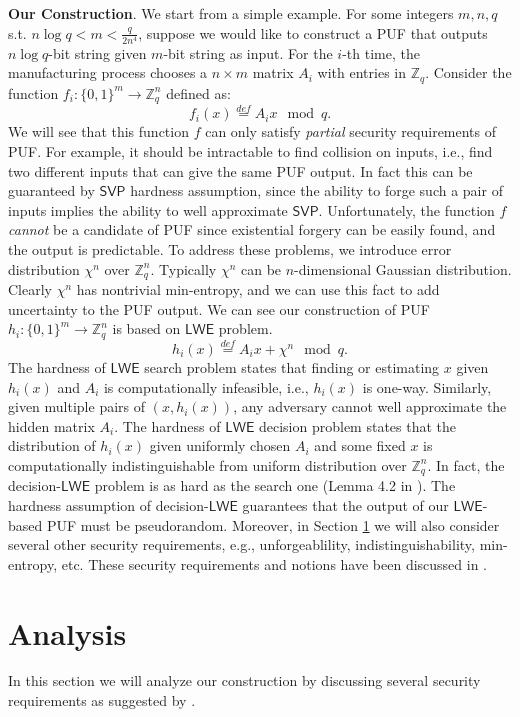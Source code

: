 \documentclass[12pt]{article}
\newcommand{\eqdef}{\stackrel{def}{=}}
\newcommand{\Z}{\mathbb{Z}}
\newcommand{\bits}{\{0,1\}}
\newcommand{\SVP}{\mathsf{SVP}}
\newcommand{\LWE}{\mathsf{LWE}}
\theoremstyle{definition}
\begin{document}
{\bf Our Construction}. We start from a simple example. For some integers $m, n, q$ s.t. $n\log q < m < \frac{q}{2n^4}$, suppose we would like to construct a PUF that outputs $n \log q$-bit string given $m$-bit string as input. For the $i$-th time, the manufacturing process chooses a $n\times m$ matrix $A_i$ with entries in $\Z_q$. Consider the function $f_i : \bits^m \to \Z_q^n$ defined as:
$$f_i(x) \eqdef A_ix \mod q.$$
We will see that this function $f$ can only satisfy \emph{partial} security requirements of PUF. For example, it should be intractable to find collision on inputs, i.e., find two different inputs that can give the same PUF output. In fact this can be guaranteed by $\SVP$ hardness assumption, since the ability to forge such a pair of inputs implies the ability to well approximate $\SVP$. Unfortunately, the function $f$ \emph{cannot} be a candidate of PUF since existential forgery can be easily found, and the output is predictable. To address these problems, we introduce error distribution $\chi^n$ over $\Z_q^n$. Typically $\chi^n$ can be $n$-dimensional Gaussian distribution. Clearly $\chi^n$ has nontrivial min-entropy, and we can use this fact to add uncertainty to the PUF output. We can see our construction of PUF $h_i : \bits^m \to \Z_q^n$ is based on $\LWE$ problem.
$$h_i(x) \eqdef A_ix + \chi^n \mod q.$$
The hardness of $\LWE$ search problem states that finding or estimating $x$ given $h_i(x)$ and $A_i$ is computationally infeasible, i.e., $h_i(x)$ is one-way. Similarly, given multiple pairs of $(x, h_i(x))$, any adversary cannot well approximate the hidden matrix $A_i$. The hardness of $\LWE$ decision problem states that the distribution of $h_i(x)$ given uniformly chosen $A_i$ and some fixed $x$ is computationally indistinguishable from uniform distribution over $\Z_q^n$. In fact, the decision-$\LWE$ problem is as hard as the search one (Lemma 4.2 in \cite{regev2009lattices}). The hardness assumption of decision-$\LWE$ guarantees that the output of our $\LWE$-based PUF must be pseudorandom. Moreover, in Section \ref{sec:a} we will also consider several other security requirements, e.g., unforgeablility, indistinguishability, min-entropy, etc. These security requirements and notions have been discussed in \cite{sadeghi2016towards}.

\section{Analysis}
\label{sec:a}
In this section we will analyze our construction by discussing several security requirements as suggested by \cite{sadeghi2016towards}.
\end{document}
